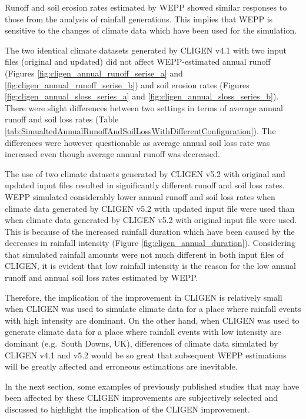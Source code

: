 Runoff and soil erosion rates estimated by WEPP showed similar responses to
those from the analysis of rainfall generations. This implies that WEPP is
sensitive to the changes of climate data which have been used for the
simulation.

The two identical climate datasets generated by CLIGEN v4.1 with two input
files (original and updated) did not affect WEPP-estimated annual runoff
(Figures \ref{fig:cligen_annual_runoff_serise_a} and
\ref{fig:cligen_annual_runoff_serise_b}) and soil erosion rates (Figures
\ref{fig:cligen_annual_sloss_series_a} and
\ref{fig:cligen_annual_sloss_series_b}).
There were slight differences between two settings in terms of average annual
runoff and soil loss rates (Table
\ref{tab:SimualtedAnnualRunoffAndSoilLossWithDifferentConfiguration}). The
differences were however questionable as average annual soil loss rate was
increased even though average annual runoff was decreased.

The use of two climate datasets generated by CLIGEN v5.2 with original and
updated input files resulted in significantly different runoff and soil loss
rates. WEPP simulated considerably lower annual runoff and soil loss rates when
climate data generated by CLIGEN v5.2 with updated input file were used
than when climate data generated by CLIGEN v5.2 with original input file
were used. This is because of the increased rainfall duration which have
been caused by the decreases in rainfall intensity (Figure
\ref{fig:cligen_annual_duration}). Considering that simulated rainfall amounts
were not much different in both input files of CLIGEN, it is evident that low
rainfall intensity is the reason for the low annual runoff and annual soil loss
rates estimated by WEPP.

Therefore, the implication of the improvement in CLIGEN is relatively small when
CLIGEN was used to simulate climate data for a place where rainfall events
with high intensity are dominant. On the other hand, when CLIGEN was used
to generate climate data for a place where rainfall events with low intensity
are dominant (e.g.\ South Downs, UK), differences of climate data simulated by
CLIGEN v4.1 and v5.2 would be so great that subsequent WEPP estimations will be
greatly affected and erroneous estimations are inevitable.

In the next section, some examples of previously published studies that may have
been affected by these CLIGEN improvements are subjectively selected and
discussed to highlight the implication of the CLIGEN improvement.

